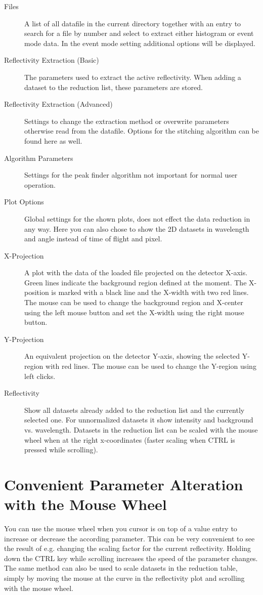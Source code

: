  \begin{description}
   \item[Files] A list of all datafile in the current directory together with an entry to search for a file by number and select to extract either histogram or event mode data. In the event mode setting additional options will be displayed.

   \item[Reflectivity Extraction (Basic)] The parameters used to extract the active reflectivity. When adding a dataset to the reduction list, these parameters are stored.
   \item[Reflectivity Extraction (Advanced)] Settings to change the extraction method or overwrite parameters otherwise read from the datafile. Options for the stitching algorithm can be found here as well.
   \item[Algorithm Parameters] Settings for the peak finder algorithm not important for normal user operation.
   \item[Plot Options] Global settings for the shown plots, does not effect the data reduction in any way. Here you can also chose to show the 2D datasets in wavelength and angle instead of time of flight and pixel.
   
   
   \item[X-Projection] A plot with the data of the loaded file projected on the detector X-axis. Green lines indicate the background region defined at the moment. The X-position is marked with a black line and the X-width with two red lines. The mouse can be used to change the background region and X-center using the left mouse button and set the X-width using the right mouse button.
   \item[Y-Projection] An equivalent projection on the detector Y-axis, showing the selected Y-region with red lines. The mouse can be used to change the Y-region using left clicks.
   
   \item[Reflectivity] Show all datasets already added to the reduction list and the currently selected one. For unnormalized datasets it show intensity and background vs. wavelength. Datasets in the reduction list can be scaled with the mouse wheel when at the right x-coordinates (faster scaling when CTRL is pressed while scrolling).
\end{description}

\section{Convenient Parameter Alteration with the Mouse Wheel}
  You can use the mouse wheel when you cursor is on top of a value entry to increase or decrease the according parameter. 
  This can be very convenient to see the result of e.g. changing the scaling factor for the current reflectivity. Holding down the CTRL key while scrolling increases the speed of the parameter changes.
  The same method can also be used to scale datasets in the reduction table, simply by moving the mouse at the curve in the reflectivity plot and scrolling with the mouse wheel.
  
